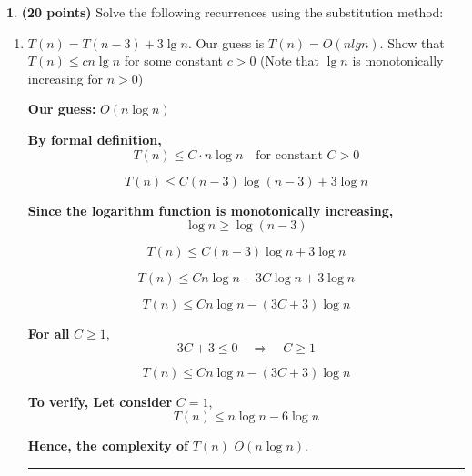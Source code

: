 \documentclass[11pt]{article}
\newcommand{\finishproblem}{
    \vspace{10pt}
    \hrule
    \vspace{10pt}
}
\theoremstyle{definition}
\newtheorem{prob}{}
\newcommand{\solution}{\medskip\noindent{\color{DarkBlue}\textbf{Solution:}}}
\begin{document}
\begin{prob} \textbf{(20 points)} Solve the following recurrences using the substitution method:
\end{prob}

\begin{enumerate}[label=(\alph*)]
\item $T(n)= T(n-3) + 3\lg n$. Our guess is $T(n) = O(nlgn)$. Show that$ T(n) \le cn\lg n$ for some constant $c > 0$ (Note that $\lg n$ is monotonically increasing for $n>0$)\\
\solution

\textbf{Our guess:} \( O(n \log n) \)  

\textbf{By formal definition,}  
\[
T(n) \leq C \cdot n \log n \quad \text{for constant } C > 0
\]

\[
T(n) \leq C(n-3) \log(n-3) + 3 \log n
\]

\textbf{Since the logarithm function is monotonically increasing,}  
\[
\log n \geq \log (n-3)
\]

\[
T(n) \leq C(n-3) \log n + 3 \log n
\]

\[
T(n) \leq C n \log n - 3C \log n + 3 \log n
\]

\[
T(n) \leq C n \log n - (3C + 3) \log n
\]

\textbf{For all } \( C \geq 1 \),   
\[
3C + 3 \leq 0 \quad \Rightarrow \quad C \geq 1
\]

\[
T(n) \leq C n \log n - (3C + 3) \log n
\]

\textbf{To verify, Let consider } \( C = 1 \),   
\[
T(n) \leq n \log n - 6 \log n
\]

\textbf{Hence, the complexity of } \( T(n) \)  \( O(n \log n) \).
\\

\finishproblem
\end{enumerate}
\end{document}
